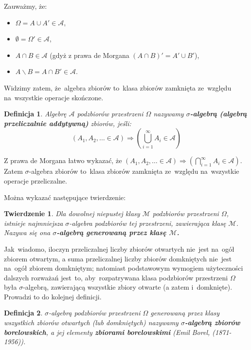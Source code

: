 \documentclass[10pt,a4paper]{article}
\newtheorem{definition}{Definicja}[section]
\newtheorem{theorem}{Twierdzenie}[section]
\numberwithin{equation}{subsection}
\begin{document}
Zauważmy, że:
\begin{itemize}
  \item $\Omega=A\cup A' \in \mathscr{A}$,
  \item $\emptyset=\Omega'\in\mathscr{A}$,
  \item $A\cap B\in\mathscr{A}$ (gdyż z prawa de Morgana $(A\cap B)'=A'\cup B'$),
  \item $A\backslash B=A\cap B' \in\mathscr{A}$.
\end{itemize}
Widzimy zatem, że~algebra zbiorów to~klasa zbiorów zamknięta ze~względu
na~wszystkie operacje skończone.

\begin{definition}
  Algebrę $\mathscr{A}$ podzbiorów przestrzeni $\Omega$ nazywamy
  \textbf{$\sigma$-algebrą (algebrą przeliczalnie addytywną)} zbiorów, jeśli:
  \begin{equation}
    \left(A_1, A_2,\dotsc \in \mathscr{A}\right) \Longrightarrow
    \left(\bigcup_{i=1}^{\infty}A_i\in\mathscr{A}\right)
  \end{equation}
\end{definition}
Z prawa de Morgana łatwo wykazać, że $(A_1, A_2,\dotsc\in \mathscr{A})
\Longrightarrow \left(\bigcap_{i=1}^{\infty}A_i\in\mathscr{A}\right)$. Zatem
$\sigma$-algebra zbiorów to~klasa zbiorów zamknięta ze~względu na~wszystkie
operacje przeliczalne.

Można wykazać następujące twierdzenie:
\begin{theorem}
  Dla dowolnej niepustej klasy $\mathscr{M}$ podzbiorów przestrzeni $\Omega$,
  istnieje najmniejsza $\sigma$-algebra podzbiorów tej przestrzeni,
  zawierająca klasę $\mathscr{M}$. Nazywa się ona \textbf{$\sigma$-algebrą
    generowaną przez klasę $\mathscr{M}$.}
\end{theorem}

Jak~wiadomo, iloczyn przeliczalnej liczby zbiorów otwartych nie~jest na~ogół
zbiorem otwartym, a suma przeliczalnej liczby zbiorów domkniętych nie~jest
na~ogół zbiorem domkniętym; natomiast podstawowym wymogiem użyteczności dalszych
rozważań jest~to, aby~rozpatrywana klasa podzbiorów przestrzeni $\Omega$ była
$\sigma$-algebrą, zawierającą wszystkie zbiory otwarte (a zatem i~domknięte).
Prowadzi to do kolejnej definicji.
\begin{definition}
  $\sigma$-algebrą podzbiorów przestrzeni $\Omega$ generowaną przez klasy
  wszystkich zbiorów otwartych (lub domkniętych) nazywamy \textbf{$\sigma$-algebrą
  zbiorów borelowskich}, a jej elementy \textbf{zbiorami borelowskimi}
  (Emil Borel, (1871-1956)).
\end{definition}
\end{document}
